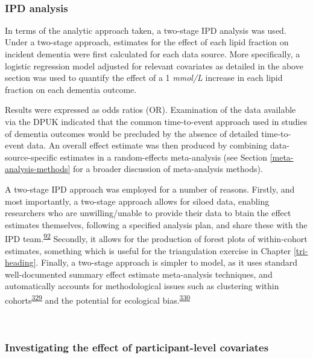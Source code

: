 \documentclass[a4paper, twoside]{templates/ociamthesis}
\begin{document}
~

\hypertarget{ipd-analysis}{%
\subsubsection{IPD analysis}\label{ipd-analysis}}

In terms of the analytic approach taken, a two-stage IPD analysis was used. Under a two-stage approach, estimates for the effect of each lipid fraction on incident dementia were first calculated for each data source. More specifically, a logistic regression model adjusted for relevant covariates as detailed in the above section was used to quantify the effect of a 1 \emph{mmol/L} increase in each lipid fraction on each dementia outcome.

Results were expressed as odds ratios (OR). Examination of the data available via the DPUK indicated that the common time-to-event approach used in studies of dementia outcomes would be precluded by the absence of detailed time-to-event data. An overall effect estimate was then produced by combining data-source-specific estimates in a random-effects meta-analysis (see Section \ref{meta-analysis-methods} for a broader discussion of meta-analysis methods).

A two-stage IPD approach was employed for a number of reasons. Firstly, and most importantly, a two-stage approach allows for siloed data, enabling researchers who are unwilling/unable to provide their data to btain the effect estimates themselves, following a specified analysis plan, and share these with the IPD team.\textsuperscript{\protect\hyperlink{ref-riley2010}{92}} Secondly, it allows for the production of forest plots of within-cohort estimates, something which is useful for the triangulation exercise in Chapter \ref{tri-heading}. Finally, a two-stage approach is simpler to model, as it uses standard well-documented summary effect estimate meta-analysis techniques, and automatically accounts for methodological issues such as clustering within cohorts\textsuperscript{\protect\hyperlink{ref-abo-zaid2013}{329}} and the potential for ecological bias.\textsuperscript{\protect\hyperlink{ref-burke2017}{330}}

~

\hypertarget{investigating-the-effect-of-participant-level-covariates}{%
\subsubsection{Investigating the effect of participant-level covariates}\label{investigating-the-effect-of-participant-level-covariates}}
\end{document}
